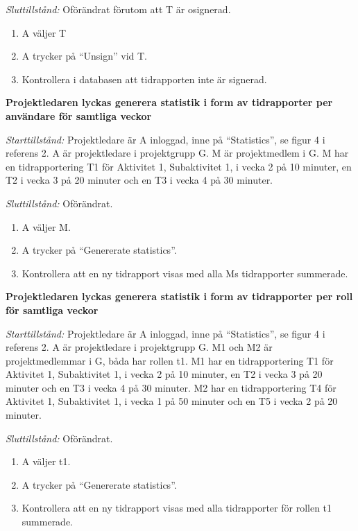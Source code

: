 \documentclass[a4paper]{article}
\begin{document}
\begin{FT}
\emph{Sluttillstånd:} Oförändrat förutom att T är osignerad.

\begin{enumerate}
\item A väljer T
\item A trycker på ``Unsign'' vid T.
\item Kontrollera i databasen att tidrapporten inte är signerad.
\end{enumerate}



\item
\textbf{Projektledaren lyckas generera statistik i form av tidrapporter per användare för samtliga veckor}

\emph{Starttillstånd:} Projektledare är A inloggad, inne på ``Statistics'', se figur 4 i referens 2. A är projektledare i projektgrupp G. M är projektmedlem i G. M har en tidrapportering T1 för Aktivitet 1, Subaktivitet 1, i vecka 2 på 10 minuter, en T2 i vecka 3 på 20 minuter och en T3 i vecka 4 på 30 minuter. 

\emph{Sluttillstånd:} Oförändrat.

\begin{enumerate}
\item A väljer M.
\item A trycker på ``Genererate statistics''.
\item Kontrollera att en ny tidrapport visas med alla Ms tidrapporter summerade.
\end{enumerate}



\item
\textbf{Projektledaren lyckas generera statistik i form av tidrapporter per roll för samtliga veckor}

\emph{Starttillstånd:} Projektledare är A inloggad, inne på ``Statistics'', se figur 4 i referens 2. A är projektledare i projektgrupp G. M1 och M2 är projektmedlemmar i G, båda har rollen t1. M1 har en tidrapportering T1 för Aktivitet 1, Subaktivitet 1, i vecka 2 på 10 minuter, en T2 i vecka 3 på 20 minuter och en T3 i vecka 4 på 30 minuter. M2 har en tidrapportering T4 för Aktivitet 1, Subaktivitet 1, i vecka 1 på 50 minuter och en T5 i vecka 2 på 20 minuter.

\emph{Sluttillstånd:} Oförändrat.

\begin{enumerate}
\item A väljer t1.
\item A trycker på ``Genererate statistics''.
\item Kontrollera att en ny tidrapport visas med alla tidrapporter för rollen t1 summerade.
\end{enumerate}



\end{FT}
\end{document}
